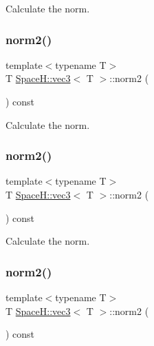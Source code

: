Calculate the norm. 

\mbox{\label{struct_space_h_1_1vec3_a62dcbdc184d4228da839845c7e179eea}} 
\subsubsection{\texorpdfstring{norm2()}{norm2()}\hspace{0.1cm}{\footnotesize\ttfamily [1/4]}}
{\footnotesize\ttfamily template$<$typename T$>$ \\
T \mbox{\hyperlink{struct_space_h_1_1vec3}{Space\+H\+::vec3}}$<$ T $>$\+::norm2 (\begin{DoxyParamCaption}{ }\end{DoxyParamCaption}) const\hspace{0.3cm}{\ttfamily [inline]}}



Calculate the norm. 

\mbox{\label{struct_space_h_1_1vec3_a62dcbdc184d4228da839845c7e179eea}} 
\subsubsection{\texorpdfstring{norm2()}{norm2()}\hspace{0.1cm}{\footnotesize\ttfamily [2/4]}}
{\footnotesize\ttfamily template$<$typename T$>$ \\
T \mbox{\hyperlink{struct_space_h_1_1vec3}{Space\+H\+::vec3}}$<$ T $>$\+::norm2 (\begin{DoxyParamCaption}{ }\end{DoxyParamCaption}) const\hspace{0.3cm}{\ttfamily [inline]}}



Calculate the norm. 

\mbox{\label{struct_space_h_1_1vec3_a62dcbdc184d4228da839845c7e179eea}} 
\subsubsection{\texorpdfstring{norm2()}{norm2()}\hspace{0.1cm}{\footnotesize\ttfamily [3/4]}}
{\footnotesize\ttfamily template$<$typename T$>$ \\
T \mbox{\hyperlink{struct_space_h_1_1vec3}{Space\+H\+::vec3}}$<$ T $>$\+::norm2 (\begin{DoxyParamCaption}{ }\end{DoxyParamCaption}) const\hspace{0.3cm}{\ttfamily [inline]}}



